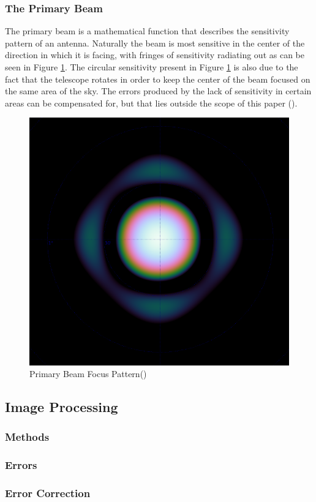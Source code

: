 \subsubsection{The Primary Beam}\label{ra:ssec:tpb}
The primary beam is a mathematical function that describes the sensitivity pattern of an antenna. Naturally the beam is most sensitive in the center of the direction in which it is facing, with fringes of sensitivity radiating out as can be seen in Figure \ref{ra:fig:beam}. The circular sensitivity present in Figure \ref{ra:fig:beam} is also due to the fact that the telescope rotates in order to keep the center of the beam focused on the same area of the sky. The errors produced by the lack of sensitivity in certain areas can be compensated for, but that lies outside the scope of this paper (\cite{oleg}).
%
\begin{figure}[H]
	\centering
	\label{ra:fig:beam}
	\includegraphics[scale=0.28]{Images/beam.png}
	\caption{Primary Beam Focus Pattern(\cite{oleg})}
\end{figure}
\subsection{Image Processing}\label{ra:sec:img}
%
\subsubsection{Methods}\label{ra:ssec:meth}
%
\subsubsection{Errors}\label{ra:ssec:err}
%
\subsubsection{Error Correction}\label{ra:ssec:ec}
